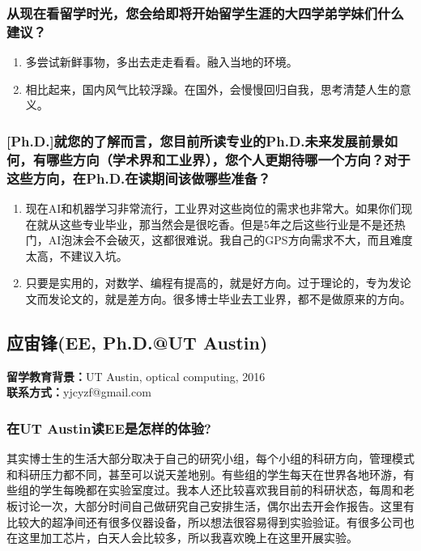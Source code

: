 \documentclass[a4paper,UTF8]{book}
\begin{document}
    \subsubsection*{从现在看留学时光，您会给即将开始留学生涯的大四学弟学妹们什么建议？}
        \begin{enumerate}[itemindent=0pt,itemsep=0pt,parsep=0pt]
            \item 多尝试新鲜事物，多出去走走看看。融入当地的环境。
            \item 相比起来，国内风气比较浮躁。在国外，会慢慢回归自我，思考清楚人生的意义。
        \end{enumerate}
    \subsubsection*{[Ph.D.]就您的了解而言，您目前所读专业的Ph.D.未来发展前景如何，有哪些方向（学术界和工业界），您个人更期待哪一个方向？对于这些方向，在Ph.D.在读期间该做哪些准备？}
        \begin{enumerate}[itemindent=0pt,itemsep=0pt,parsep=0pt]
            \item 现在AI和机器学习非常流行，工业界对这些岗位的需求也非常大。如果你们现在就从这些专业毕业，那当然会是很吃香。但是5年之后这些行业是不是还热门，AI泡沫会不会破灭，这都很难说。我自己的GPS方向需求不大，而且难度太高，不建议入坑。
            \item 只要是实用的，对数学、编程有提高的，就是好方向。过于理论的，专为发论文而发论文的，就是差方向。很多博士毕业去工业界，都不是做原来的方向。
        \end{enumerate}



\clearpage
\subsection{应宙锋(EE, Ph.D.@UT Austin)}
    \textbf{留学教育背景：}UT Austin, optical computing, 2016\\
    \textbf{联系方式：}yjcyzf@gmail.com

    \subsubsection*{在UT Austin读EE是怎样的体验?}
    其实博士生的生活大部分取决于自己的研究小组，每个小组的科研方向，管理模式和科研压力都不同，甚至可以说天差地别。有些组的学生每天在世界各地环游，有些组的学生每晚都在实验室度过。我本人还比较喜欢我目前的科研状态，每周和老板讨论一次，大部分时间自己做研究自己安排生活，偶尔出去开会作报告。这里有比较大的超净间还有很多仪器设备，所以想法很容易得到实验验证。有很多公司也在这里加工芯片，白天人会比较多，所以我喜欢晚上在这里开展实验。
    
\end{document}
